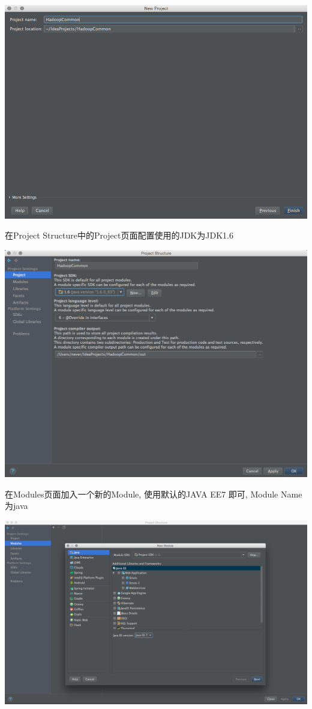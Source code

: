 \includegraphics[width=\textwidth]{image/env/cr22.png}

在Project Structure中的Project页面配置使用的JDK为JDK1.6

\includegraphics[width=\textwidth]{image/env/cr23.png}

在Modules页面加入一个新的Module, 使用默认的JAVA EE7 即可, Module Name为java

\includegraphics[width=\textwidth]{image/env/cr24.png}

